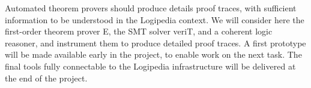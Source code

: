 \begin{workpackage}
\begin{tasklist}
\begin{task}[id=instrumenting,
      title=Instrumenting ATPs to produce traces,
      lead=Lie,
      LieRM=28,
      ImtRM=0,
      OcaRM=12,
      BelRM=6,
    ]
    Automated theorem provers should produce details proof traces, with
    sufficient information to be understood in the Logipedia context.  We will
    consider here the first-order theorem prover E, the SMT solver veriT, and a
    coherent logic reasoner, and instrument them to produce detailed proof
    traces.  A first prototype will be made available early in the project, to
    enable work on the next task.  The final tools fully connectable to the
    Logipedia infrastructure will be delivered at the end of the project.








\end{task}


  \begin{task}[id=tracetodedukti,
      title=Translate ATP traces into Dedukti,
      lead=Imt,
      LieRM=12,
      ImtRM=8,
      SacRM=2,
    ]


\end{task}
\end{tasklist}
\end{workpackage}
